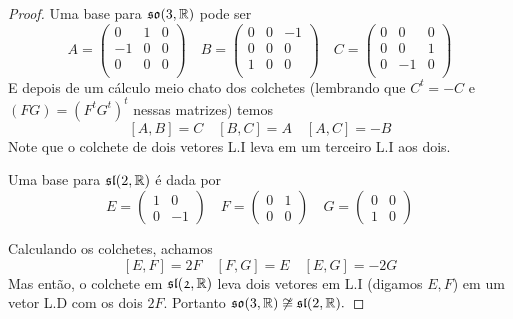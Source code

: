 \begin{proof}
    Uma base para $\mathfrak{so}(3,\mathbb{R})$ pode ser 
    $$A = \begin{pmatrix}
        0 & 1 & 0\\
        -1 & 0 & 0\\
        0 & 0 & 0\\
    \end{pmatrix}
    \quad
    B = \begin{pmatrix}
        0 & 0 & -1\\
        0 & 0 & 0\\
        1 & 0 & 0\\
    \end{pmatrix}
    \quad
    C = \begin{pmatrix}
        0 & 0 & 0\\
        0 & 0 & 1\\
        0 & -1 & 0\\
    \end{pmatrix}$$
    E depois de um cálculo meio chato dos colchetes (lembrando que $C^t = -C$ e $(FG) = (F^tG^t)^t$ nessas matrizes)
    temos 
    $$[A,B] = C \quad [B,C] = A \quad [A,C] = -B$$
    Note que o colchete de dois vetores L.I leva em um terceiro L.I aos dois.
    
    Uma base para $\mathfrak{sl}(2,\mathbb{R})$ é dada por
    $$E = \begin{pmatrix}
        1 & 0 \\
        0 & -1
    \end{pmatrix}
    \quad
    F = \begin{pmatrix}
        0 & 1 \\
        0 & 0 
    \end{pmatrix}
    \quad
    G = \begin{pmatrix}
        0 & 0 \\
        1 & 0 
    \end{pmatrix}$$
    
    Calculando os colchetes, achamos
    $$[E,F] = 2F \quad [F,G] = E \quad [E,G] = -2G $$
    Mas então, o colchete em $\mathfrak{sl(2,\mathbb{R})}$ leva dois vetores em L.I (digamos $E,F$) em um vetor L.D com os dois $2F$.
    Portanto $\mathfrak{so}(3,\mathbb{R}) \not \cong \mathfrak{sl}(2,\mathbb{R}).$
\end{proof}
    
